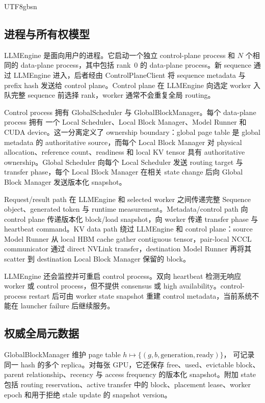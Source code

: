 \documentclass[11pt,a4paper]{article}
\begin{document}
\begin{CJK*}{UTF8}{gbsn}
\subsection{进程与所有权模型}

LLMEngine 是面向用户的进程。它启动一个独立 control-plane process 和 $N$ 个相同的
data-plane process，其中包括 rank~0 的 data-plane process。新 sequence 通过 LLMEngine
进入，后者经由 ControlPlaneClient 将 sequence metadata 与 prefix hash 发送给 control
plane。Control plane 在 LLMEngine 向选定 worker 入队完整 sequence 前选择 rank，worker
通常不会重复全局 routing。

Control process 拥有 GlobalScheduler 与 GlobalBlockManager。每个 data-plane process 拥有
一个 Local Scheduler、Local Block Manager、Model Runner 和 CUDA device。这一分离定义了
ownership boundary：global page table 是 global metadata 的 authoritative source，而每个
Local Block Manager 对 physical allocation、reference count、readiness 和 local KV tensor
具有 authoritative ownership。Global Scheduler 向每个 Local Scheduler 发送 routing target
与 transfer phase，每个 Local Block Manager 在相关 state change 后向 Global Block Manager
发送版本化 snapshot。

Request/result path 在 LLMEngine 和 selected worker 之间传递完整 Sequence object、generated
token 与 runtime measurement。Metadata/control path 向 control plane 传递版本化 block/load
snapshot，向 worker 传递 transfer phase 与 heartbeat command。KV data path 绕过 LLMEngine
和 control plane：source Model Runner 从 local HBM cache gather contiguous tensor，pair-local
NCCL communicator 通过 direct NVLink transfer，destination Model Runner 再将其 scatter 到
destination Local Block Manager 保留的 block。

LLMEngine 还会监控并可重启 control process。双向 heartbeat 检测无响应 worker 或 control
process，但不提供 consensus 或 high availability。control-process restart 后可由 worker state
snapshot 重建 control metadata，当前系统不能在 launcher failure 后继续服务。

\subsection{权威全局元数据}

GlobalBlockManager 维护 page table $h \mapsto \{(g,b,\mathrm{generation},\mathrm{ready})\}$，
可记录同一 hash 的多个 replica。对每张 GPU，它还保存 free、used、evictable block、parent
relationship、recency 与 access frequency 的版本化 snapshot。附加 state 包括 routing
reservation、active transfer 中的 block、placement lease、worker epoch 和用于拒绝 stale
update 的 snapshot version。


\end{CJK*}
\end{document}
